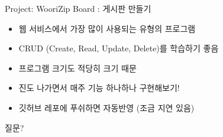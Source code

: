 \documentclass{beamer}
\begin{document}
    \begin{frame}{Project: WooriZip Board : 게시판 만들기}
        \begin{itemize}
            \item 웹 서비스에서 가장 많이 사용되는 유형의 프로그램
            \item CRUD (Create, Read, Update, Delete)를 학습하기 좋음
            \item 프로그램 크기도 적당히 크기 때문
            \item 진도 나가면서 매주 기능 하나하나 구현해보기!
            \item 깃허브 레포에 푸쉬하면 자동반영 (조금 지연 있음)
        \end{itemize}
    \end{frame}

    \begin{frame}{질문?}

    \end{frame}
\end{document}
